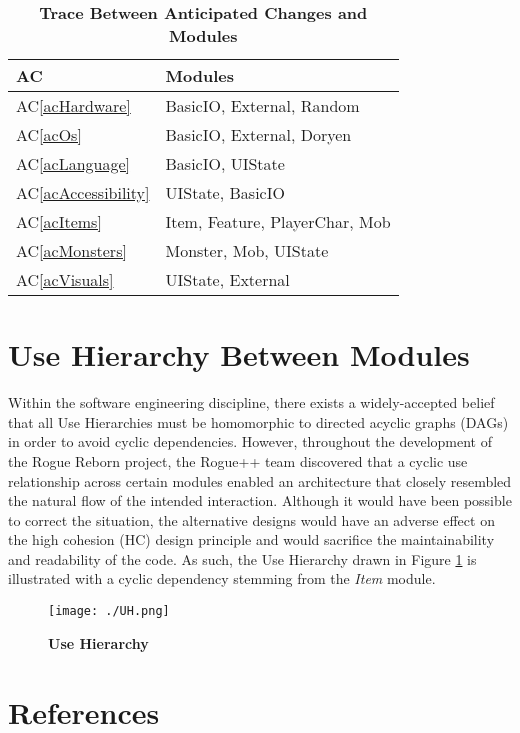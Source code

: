 \documentclass[12pt, titlepage]{article}
\newcommand{\newSection}[1]{
  \newpage
  \section{#1}
}
\newcommand{\acref}[1]{AC\ref{#1}}
\begin{document}
\begin{table}[H] 
    \label{TblACT}
    \caption{\bf Trace Between Anticipated Changes and Modules}
    
    \def\arraystretch{1.1}
    \centering
    \bigskip
    \begin{tabular}{p{} p{}}

        \toprule
        \textbf{AC} & \textbf{Modules}\\
        \midrule
        \acref{acHardware} & BasicIO, External, Random\\
        \acref{acOs} & BasicIO, External, Doryen\\
        \acref{acLanguage} & BasicIO, UIState\\
        \acref{acAccessibility} & UIState, BasicIO\\
        \acref{acItems} & Item, Feature, PlayerChar, Mob\\
        \acref{acMonsters} & Monster, Mob, UIState\\
        \acref{acVisuals} & UIState, External\\

        \bottomrule
    \end{tabular}
\end{table}

\newSection{Use Hierarchy Between Modules} \label{SecUse}

    Within the software engineering discipline, there exists a widely-accepted belief that all Use Hierarchies must be homomorphic to directed acyclic graphs (DAGs) in order to avoid cyclic dependencies.  However, throughout the development of the Rogue Reborn project, the Rogue++ team discovered that a cyclic use relationship across certain modules enabled an architecture that closely resembled the natural flow of the intended interaction.  Although it would have been possible to correct the situation, the alternative designs would have an adverse effect on the high cohesion (HC) design principle and would sacrifice the maintainability and readability of the code.  As such, the Use Hierarchy drawn in Figure \hyperref[FigUH]{1} is illustrated with a cyclic dependency stemming from the \textit{Item} module.

    \begin{figure}[H]
        \label{FigUH}
        \caption{\bf Use Hierarchy}
        \centering
        \bigskip
        \texttt{[image: ./UH.png]}
    \end{figure}

\newSection{References} \label{SecRef}

\end{document}
